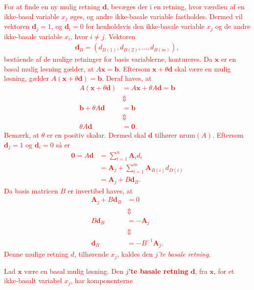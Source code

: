 \textcolor{red}{
For at finde en ny mulig retning $\mathbf{d}$, bevæges der i en retning, hvor værdien af en ikke-basal variable $x_j$ øges, og andre ikke-basale variable fastholdes. 
Dermed vil vektoren $\mathbf{d}_j = 1$, og $\mathbf{d}_i = 0$ for henholdsvis den ikke-basale variable $x_j$ og de andre ikke-basale variable $x_i$, hvor $i \neq j$.
Vektoren 
\begin{align*}
\mathbf{d}_B = \left( d_{B(1)}, d_{B(2)}, \ldots , d_{B(m)} \right),
\end{align*} 
bestående af de mulige retninger for basis variablerne, 
kontureres.
Da $\mathbf{x}$ er en basal mulig løsning gælder, at $A \mathbf{x} = \mathbf{b}$. 
Eftersom $\mathbf{x}+ \theta \mathbf{d}$ skal være en mulig løsning, gælder $A ( \mathbf{x}+ \theta \mathbf{d}) = \mathbf{b}$.
Deraf haves, at 
\begin{align*}
A ( \mathbf{x}+ \theta \mathbf{d}) &=  A \mathbf{x} + \theta A \mathbf{d} = \mathbf{b} \\
& \Updownarrow \\
\mathbf{b} + \theta A \mathbf{d} & = \mathbf{b} \\
& \Updownarrow \\
\theta A \mathbf{d} & = \mathbf{0}.
\end{align*} 
Bemærk, at $\theta$ er en positiv skalar. 
Dermed skal $\mathbf{d}$ tilhører $\text{nrum}(A)$.
Eftersom $\mathbf{d}_j = 1$ og $\mathbf{d}_i = 0$ så er 
%
\begin{align*}
\mathbf{0} = A \mathbf{d} & = \sum^n_{i = 1} \mathbf{A}_i d_i \\
& =  \mathbf{A}_j  + \sum^m_{i = 1} \mathbf{A}_{B(i)} d_{D(i)} \\
& =  \mathbf{A}_j  + B \mathbf{d}_B.
\end{align*}
%
Da basis matricen $B$ er invertibel haves, at 
% 
\begin{align*}
\mathbf{A}_j  + B \mathbf{d}_B & = 0 \\
& \Updownarrow \\
B \mathbf{d}_B & = - \mathbf{A}_j \\
& \Updownarrow \\
\mathbf{d}_B & = - B^{-1} \mathbf{A}_j .
\end{align*}
% 
Denne mulige retning $d$, tilhørende $x_j$, kaldes den \textit{$j$'te basale retning}.
% 
\begin{defn}{}{}
Lad $\mathbf{x}$ være en basal mulig løsning. 
Den \textbf{$j$'te basale retning} $\mathbf{d}$, fra $\mathbf{x}$, for et ikke-basalt variabel $x_j$, har komponenterne 

\end{defn}}

